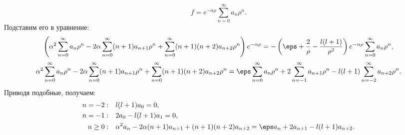 \documentclass{minimal}
\begin{document}
\[
    f = e^{-\alpha\rho}\sum_{n=0}^{\infty} a_n\rho^n.
\]
Подставим его в уравнение:
\[
    \left( \alpha^2 \sum_{n=0}^{\infty} a_n\rho^n -
    2\alpha\sum_{n=0}^{\infty} (n+1)a_{n+1}\rho^n +
    \sum_{n=0}^{\infty} (n+1)(n+2)a_{n+2}\rho^n \right)e^{-\alpha\rho}
    = - \left(\eps + \frac{2}{\rho} - \frac{l(l+1)}{\rho^2}\right)
    e^{-\alpha\rho}\sum_{n=0}^{\infty} a_n\rho^n,
\]
\[
    \alpha^2 \sum_{n=0}^{\infty} a_n\rho^n -
    2\alpha\sum_{n=0}^{\infty} (n+1)a_{n+1}\rho^n +
    \sum_{n=0}^{\infty} (n+1)(n+2)a_{n+2}\rho^n =
    \eps\sum_{n=0}^{\infty} a_n\rho^n +
    2\sum_{n=-1}^{\infty} a_{n+1}\rho^n -
    l(l+1)\sum_{n=-2}^{\infty} a_{n+2}\rho^n.
\]
Приводя подобные, получаем:
\begin{align*}
    n=-2:&\quad l(l+1)a_0 = 0,\\
    n=-1:&\quad 2a_0 - l(l+1)a_1 = 0,\\
    n\ge0:&\quad \alpha^2 a_n - 2\alpha(n+1)a_{n+1}+
    (n+1)(n+2)a_{n+2} = \eps a_n +
    2 a_{n+1} - l(l+1)a_{n+2}.
\end{align*}
\end{document}
